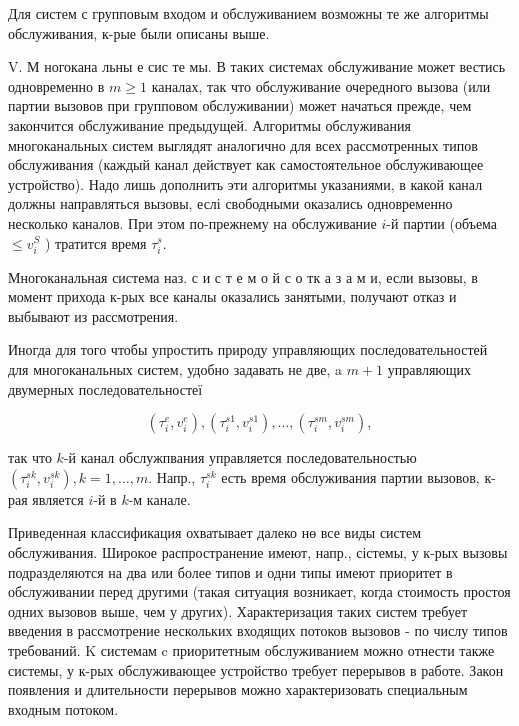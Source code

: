 \documentclass[10pt]{article}
\begin{document}
Для систем с групповым входом и обслуживанием возможны те же алгоритмы обслуживания, к-рые были описаны выше.



V. М ногокана льны е сис те мы. В таких системах обслуживание может вестись одновременно в $m \geqslant 1$ каналах, так что обслуживание очередного вызова (или партии вызовов при групповом обслуживании) может начаться прежде, чем закончится обслуживание предыдущей. Алгоритмы обслуживания многоканальных систем выглядят аналогично для всех рассмотренных типов обслуживания (каждый канал действует как самостоятельное обслуживающее устройство). Надо лишь дополнить эти алгоритмы указаниями, в какой канал должны направляться вызовы, еслі свободными оказались одновременно несколько каналов. При этом по-прежнему на обслуживание $i$-й партии (объема $\leqslant v_{i}^{S}$ ) тратится время $\tau_{i}^{s}$.



Многоканальная система наз. с и с т е м о й с о тк а з а м и, если вызовы, в момент прихода к-рых все каналы оказались занятыми, получают отказ и выбывают из рассмотрения.



Иногда для того чтобы упростить природу управляющих последовательностей для многоканальных систем, удобно задавать не две, a $m+1$ управляющих двумерных последовательностеї



\[

\left(\tau_{i}^{e}, v_{i}^{e}\right),\left(\tau_{i}^{s 1}, v_{i}^{s 1}\right), \ldots,\left(\tau_{i}^{s m}, v_{i}^{s m}\right),

\]



так что $k$-й канал обслужпвания управляется последовательностью $\left(\tau_{i}^{s k}, v_{i}^{s k}\right), k=1, \ldots, m$. Напр., $\tau_{i}^{s k}$ есть время обслуживания партии вызовов, к-рая является $i$-й в $k$-м канале.



Приведенная классификация охватывает далеко нө все виды систем обслуживания. Широкое распространение имеют, напр., сістемы, у к-рых вызовы подразделяются на два или более типов и одни типы имеют приоритет в обслуживании перед другими (такая ситуация возникает, когда стоимость простоя одних вызовов выше, чем у других). Характеризация таких систем требует введения в рассмотрение нескольких входящих потоков вызовов - по числу типов требований. $\mathrm{K}$ системам c приоритетным обслуживанием можно отнести также системы, у к-рых обслуживающее устройство требует перерывов в работе. Закон появления и длительности перерывов можно характеризовать специальным входным потоком.
\end{document}
